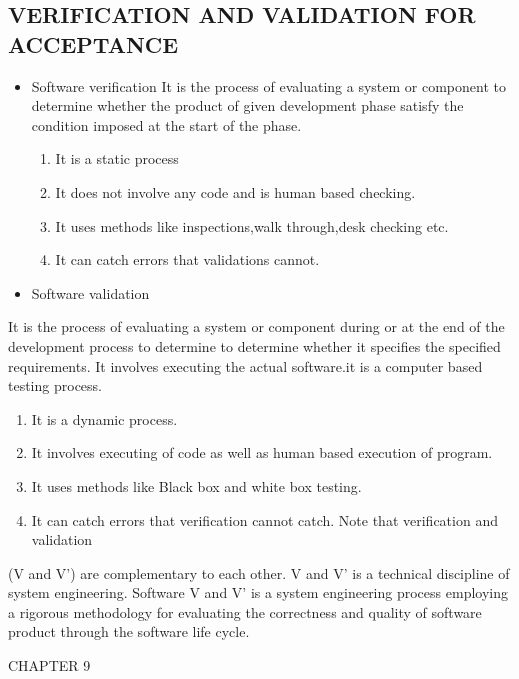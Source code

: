 \documentclass[12pt,a4paper]
{article}
\numberwithin{table}{section}
\begin{document}
{{{{{{{{\subsection{VERIFICATION AND VALIDATION FOR ACCEPTANCE}
\begin{itemize}
\item Software verification
It is the process of evaluating a system or component to determine whether the product of given development phase satisfy the condition imposed at the start of the phase.
\begin{enumerate}
\item It is a static process
\item It does not involve any code and is human based checking.
\item It uses methods like inspections,walk through,desk checking etc.
\item It can catch errors that validations cannot.
\end{enumerate}
\item Software validation
\end{itemize}
It is the process of evaluating a system or component during or at the end of the development process to determine to determine whether it specifies the specified requirements. It involves executing the actual software.it is a computer based testing process.
\begin{enumerate}
\item It is a dynamic process.
\item It involves executing of code as well as human based execution of program.
\item It uses methods like Black box and white box testing.
\item It can catch errors that verification cannot catch. Note that verification and validation
\end{enumerate}
(V and V') are complementary to each other.
V and V' is a technical discipline of system engineering. Software V and V' is a system engineering process employing a rigorous methodology for evaluating the correctness and quality of software product through the software life cycle.

  

\newpage
\newpage
\begin{minipage}{15cm}


\vspace{4 in}
 \begin{center} 
\begin{Huge}
CHAPTER 9


\end{Huge}
\end{center}
\end{minipage}}}}}}}}}
\end{document}
